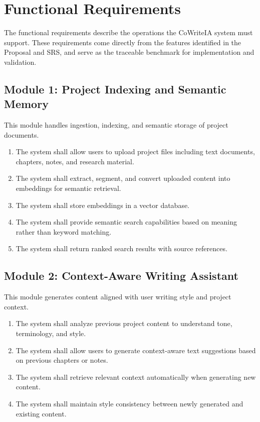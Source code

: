 \section{Functional Requirements}
The functional requirements describe the operations the CoWriteIA system must support. These requirements come directly from the features identified in the Proposal and SRS, and serve as the traceable benchmark for implementation and validation.

\subsection{Module 1: Project Indexing and Semantic Memory}
This module handles ingestion, indexing, and semantic storage of project documents.
\begin{enumerate}
    \item The system shall allow users to upload project files including text documents, chapters, notes, and research material.
    \item The system shall extract, segment, and convert uploaded content into embeddings for semantic retrieval.
    \item The system shall store embeddings in a vector database.
    \item The system shall provide semantic search capabilities based on meaning rather than keyword matching.
    \item The system shall return ranked search results with source references.
\end{enumerate}

\subsection{Module 2: Context-Aware Writing Assistant}
This module generates content aligned with user writing style and project context.
\begin{enumerate}
    \item The system shall analyze previous project content to understand tone, terminology, and style.
    \item The system shall allow users to generate context-aware text suggestions based on previous chapters or notes.
    \item The system shall retrieve relevant context automatically when generating new content.
    \item The system shall maintain style consistency between newly generated and existing content.
\end{enumerate}

